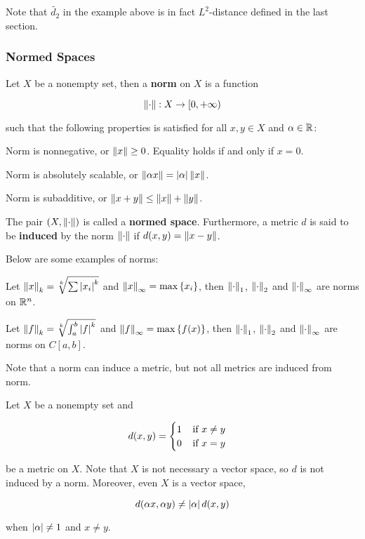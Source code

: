 \documentclass[a4paper,12pt]{article}
\begin{document}
Note that $\tilde{d_{2}}$ in the example above is in fact $L^{2}$-distance defined in the last section.

\subsubsection{Normed Spaces}
\begin{dft}
  Let $X$ be a nonempty set, then a \textbf{norm} on $X$ is a function

  $$\left\| \cdot\right\|:X\to[0,+\infty)$$\s

  such that the following properties is satisfied for all $x,y\in X$ and $\alpha\in\mathbb{R}$:

  \begin{alist}
    \item Norm is nonnegative, or $\left\| x\right\|\geq 0$. Equality holds if and only if $x=0$.
    \item Norm is absolutely scalable, or $\left\| \alpha x\right\|=\left| \alpha\right|\left\| x\right\|$.
    \item Norm is subadditive, or $\left\| x+y\right\|\leq\left\| x\right\|+\left\| y\right\|$.
  \end{alist}

  The pair $(X,\left\| \cdot\right\|)$ is called a \textbf{normed space}. Furthermore, a metric $d$ is said to be \textbf{induced} by the norm $\left\| \cdot\right\|$ if $d(x,y)=\left\| x-y\right\|$.
\end{dft}\n

\begin{exm}
  Below are some examples of norms:

  \begin{alist}
    \item Let $\left\| x\right\|_{k}=\sqrt[k]{\sum\left| x_{i}\right|^{k}}$ and $\left\| x\right\|_{\infty}=\max\left\{ x_{i}\right\}$, then $\left\| \cdot\right\|_{1}$, $\left\| \cdot\right\|_{2}$ and $\left\| \cdot\right\|_{\infty}$ are norms on $\mathbb{R}^{n}$.
    \item Let $\left\| f\right\|_{k}=\sqrt[k]{\int_{a}^{b}\left| f\right|^{k}}$ and $\left\| f\right\|_{\infty}=\max\left\{ f(x)\right\}$, then $\left\| \cdot\right\|_{1}$, $\left\| \cdot\right\|_{2}$ and $\left\| \cdot\right\|_{\infty}$ are norms on $C[a,b]$.
  \end{alist}
\end{exm}\n

Note that a norm can induce a metric, but not all metrics are induced from norm.\n

\begin{exm}
  Let $X$ be a nonempty set and

  $$d(x,y)=\begin{cases}
    1\;\;\;\;\text{if }x\neq y\\
    0\;\;\;\;\text{if }x=y
  \end{cases}$$\s

  be a metric on $X$. Note that $X$ is not necessary a vector space, so $d$ is not induced by a norm. Moreover, even $X$ is a vector space,

  $$d(\alpha x,\alpha y)\neq\left| \alpha\right|d(x,y)$$\s

  when $\left| \alpha\right|\neq 1$ and $x\neq y$.
\end{exm}\n
\end{document}
